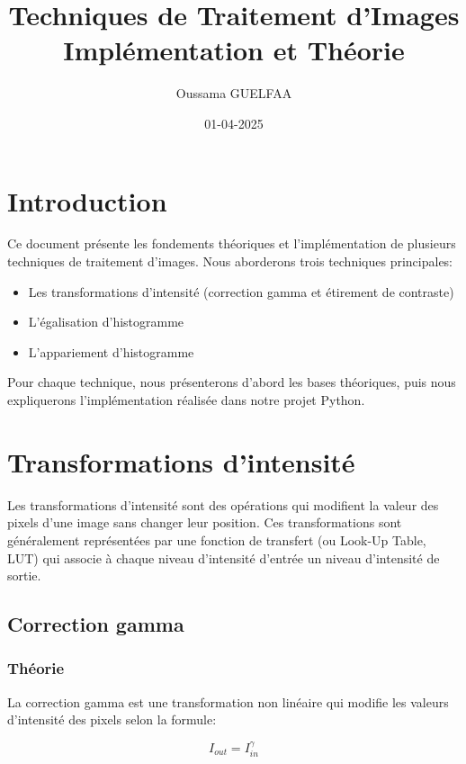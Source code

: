 \documentclass[12pt,a4paper]{article}
\title{Techniques de Traitement d'Images\\
\large Implémentation et Théorie}
\author{Oussama GUELFAA}
\date{01-04-2025}
\begin{document}
\maketitle
\tableofcontents
\newpage

\section{Introduction}

Ce document présente les fondements théoriques et l'implémentation de plusieurs techniques de traitement d'images. Nous aborderons trois techniques principales:
\begin{itemize}
    \item Les transformations d'intensité (correction gamma et étirement de contraste)
    \item L'égalisation d'histogramme
    \item L'appariement d'histogramme
\end{itemize}

Pour chaque technique, nous présenterons d'abord les bases théoriques, puis nous expliquerons l'implémentation réalisée dans notre projet Python.

\section{Transformations d'intensité}

Les transformations d'intensité sont des opérations qui modifient la valeur des pixels d'une image sans changer leur position. Ces transformations sont généralement représentées par une fonction de transfert (ou Look-Up Table, LUT) qui associe à chaque niveau d'intensité d'entrée un niveau d'intensité de sortie.

\subsection{Correction gamma}

\subsubsection{Théorie}

La correction gamma est une transformation non linéaire qui modifie les valeurs d'intensité des pixels selon la formule:

\begin{equation}
    I_{out} = I_{in}^{\gamma}
\end{equation}
\end{document}
